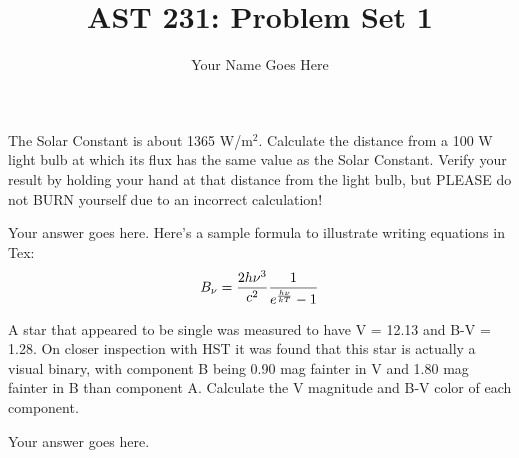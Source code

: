 \documentclass[12pt]{article}
\newenvironment{problem}[2][Problem]{\begin{trivlist}
\item[\hskip \labelsep {\bfseries #1}\hskip \labelsep {\bfseries #2.}]}{\end{trivlist}}
\newenvironment{answer}[2][Answer]{\begin{trivlist}
\item[\hskip \labelsep {\bfseries #1}\hskip \labelsep {\bfseries #2.}]}{\end{trivlist}}
\begin{document}
 
 
\title{AST 231: Problem Set 1}
\author{Your Name Goes Here}
\maketitle
 
\begin{problem}{1}
The Solar Constant is about 1365 W/m$^2$. Calculate the distance from a 100 W light bulb at which its flux has the same value as the Solar Constant. Verify your result by holding your hand at that distance from the light bulb, but PLEASE do not BURN yourself due to an incorrect calculation!
\end{problem}

\begin{answer}{1}
Your answer goes here. Here's a sample formula to illustrate writing equations in Tex:
$$B_{\nu} = {2 h \nu^3 \over c^2}{1 \over e^{h \nu \over {k T}}-1}$$
\end{answer}

\begin{problem}{2}
A star that appeared to be single was measured to have V = 12.13 and B-V = 1.28. On closer inspection with HST it was found that this star is actually a visual binary, with component B being 0.90 mag fainter in V and 1.80 mag fainter in B than component A. Calculate the V magnitude and B-V color of each component.
\end{problem}

\begin{answer}{2}
Your answer goes here. 
\end{answer}
\end{document}
